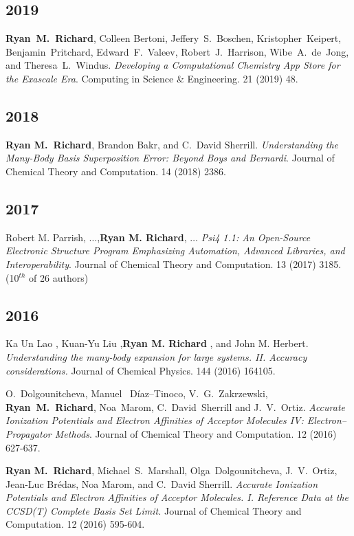 \begin{etaremune}
	\subsection{2019}
	\item{\textbf{Ryan~M.~Richard}, Colleen Bertoni, Jeffery~S.~Boschen, 
	       Kristopher~Keipert, Benjamin~Pritchard, Edward~F.~Valeev, 
		   Robert~J.~Harrison, Wibe~A.~de~Jong, and Theresa~L.~Windus. 
		   \textit{Developing a Computational Chemistry App Store for the 
		   Exascale Era}. Computing in Science \& Engineering. 21 (2019) 48.}

	\subsection{2018}
	\item{\textbf{Ryan M.~Richard}, Brandon Bakr, and C.~David Sherrill. 
	      \emph{Understanding the Many-Body Basis Superposition Error: Beyond 
		  Boys and Bernardi}. Journal of Chemical Theory and Computation. 14 
		  (2018) 2386.}

	\subsection{2017}
	\item{Robert M. Parrish, $\ldots$,\textbf{Ryan M. Richard}, $\ldots$ 
	      \emph{Psi4 1.1: An Open-Source Electronic Structure Program 
		  Emphasizing Automation, Advanced Libraries, and Interoperability}.  
		  Journal of Chemical Theory and Computation. 13 (2017) 3185. 
		  (10$^{th}$ of 26 authors)}

	\subsection{2016}
	\item{Ka Un Lao , Kuan-Yu Liu ,\textbf{Ryan M. Richard} , and John M. 
		  Herbert. \emph{Understanding the many-body expansion for large 
		  systems. II. Accuracy considerations.}  Journal of Chemical Physics.  
		  144 (2016) 164105.}
	\item{O.~Dolgounitcheva, Manuel~ D{\'i}az–Tinoco, V.~G.~Zakrzewski, 
	      \textbf{Ryan~M.~Richard}, Noa~Marom, C.~David~Sherrill and 
		  J.~V.~Ortiz. \emph{Accurate Ionization Potentials and Electron 
		  Affinities of Acceptor Molecules {IV}: Electron–Propagator Methods}.  
		  Journal of Chemical Theory and Computation. 12 (2016) 627-637.}
	\item{\textbf{Ryan M.~Richard}, Michael~S.~Marshall, Olga~Dolgounitcheva, 
	      J.~V.~Ortiz, Jean-Luc Br{\' e}das, Noa Marom, and C.~David Sherrill.  
		  \emph{Accurate Ionization Potentials and Electron Affinities of 
		  Acceptor Molecules.  {I.} Reference Data at the CCSD(T) Complete Basis
		  Set Limit.}  Journal of Chemical Theory and Computation.  12 (2016) 
		  595-604.}


\end{etaremune}
